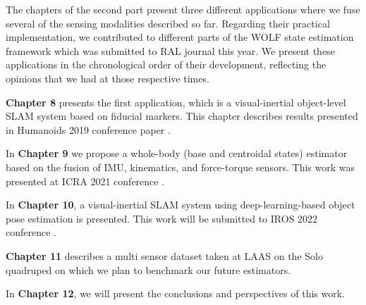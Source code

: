 \bigskip
The chapters of the second part present three different applications where we fuse several of the sensing modalities described so far.
Regarding their practical implementation, we contributed to different parts of the WOLF state estimation framework \cite{sola2021wolf} which was 
submitted to RAL journal this year. We present these applications in the chronological order of their development, reflecting the opinions that
we had at those respective times.

\bigskip
\textbf{Chapter 8} presents the first application, which is a visual-inertial object-level SLAM system based on fiducial markers. This chapter describes
results presented in Humanoids 2019 conference paper \cite{fourmy2019absolute}.

\bigskip
In \textbf{Chapter 9} we propose a whole-body (base and centroidal states) estimator based on the fusion of IMU, kinematics, and force-torque sensors. This
work was presented at ICRA 2021 conference \cite{fourmy2021contact}.

\bigskip
In \textbf{Chapter 10}, a visual-inertial SLAM system using deep-learning-based object pose estimation is presented. This work will be submitted to IROS 2022 conference \cite{debeunne2021cosyslam}.

\bigskip
\textbf{Chapter 11} describes a multi sensor dataset taken at LAAS on the Solo quadruped on which we plan to benchmark our future estimators.

\bigskip
In \textbf{Chapter 12}, we will present the conclusions and perspectives of this work.



